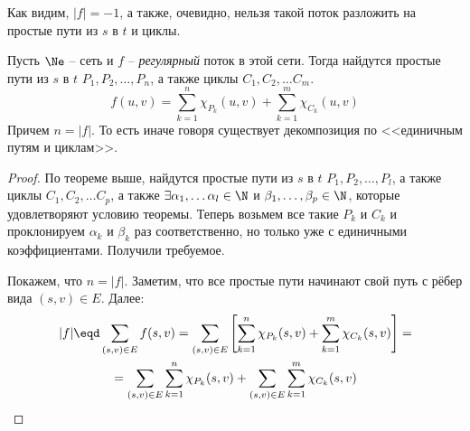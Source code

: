Как видим, $|f| = -1$, а также, очевидно, нельзя такой поток разложить на простые пути из $s$ в $t$ и циклы.

\Cons Пусть $\Ne$ -- сеть и $f$ -- \textit{регулярный} поток в этой сети. Тогда найдутся простые пути из $s$ в $t$ $P_1, P_2, \dots, P_n$, а также циклы $C_1, C_2, \dots C_m$.
\begin{equation*}
    f(u, v) = \sum\limits_{k = 1}^n \chi_{P_k}(u, v) + \sum\limits_{k = 1}^m \chi_{C_k}(u, v)
\end{equation*}
Причем $n = |f|$. То есть иначе говоря существует декомпозиция по <<единичным путям и циклам>>.
\begin{proof}

    По теореме выше, найдутся простые пути из $s$ в $t$ $P_1, P_2, \dots, P_l$, а также циклы $C_1, C_2, \dots C_p$, а также $\exists \alpha_1, \dots \alpha_l \in \N$ и $\beta_1, \dots, \beta_p \in \N$, которые удовлетворяют условию теоремы.
    Теперь возьмем все такие $P_k$ и $C_k$ и проклонируем $\alpha_k$ и $\beta_k$ раз соответственно, но только уже с единичными коэффициентами. Получили требуемое.

    Покажем, что $n = |f|$. Заметим, что все простые пути начинают свой путь с рёбер вида $(s, v) \in E$. Далее:
    \begin{multline*}
        |f| \eqd \sum\limits_{(s, v) \in E} f(s, v) = \sum\limits_{(s, v) \in E} \left[ \sum\limits_{k = 1}^n \chi_{P_k}(s, v) + \sum\limits_{k = 1}^m \chi_{C_k}(s, v) \right] = \\
        = \sum\limits_{(s, v) \in E} \sum\limits_{k = 1}^n \chi_{P_k}(s, v) + \sum\limits_{(s, v) \in E}\sum\limits_{k = 1}^m \chi_{C_k}(s, v)
    \end{multline*}


\end{proof}
